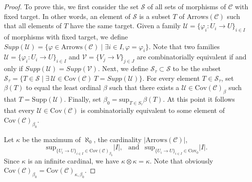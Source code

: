\begin{proof}
To prove this, we first consider the set $\mathcal{S}$ of all
sets of morphisms of $\mathcal{C}$ with fixed target.
In other words, an element of $\mathcal{S}$ is a subset $T$
of $\text{Arrows}(\mathcal{C})$ such that all
elements of $T$ have the same target. Given a family
$\mathcal{U} = \{\varphi_i : U_i \to U\}_{i\in I}$ of morphisms with fixed
target, we define
$Supp(\mathcal{U}) = \{ \varphi \in \text{Arrows}(\mathcal{C})
\mid \exists i\in I, \varphi = \varphi_i\}$.
Note that two families $\mathcal{U} =  \{\varphi_i : U_i \to U\}_{i\in I}$
and $\mathcal{V} = \{V_j \to V\}_{j \in J}$ are combinatorially
equivalent if and only if $Supp(\mathcal{U}) = Supp(\mathcal{V})$.
Next, we define
$\mathcal{S}_\tau \subset \mathcal{S}$ to be the subset
$\mathcal{S}_\tau = \{ T \in \mathcal{S} \mid
\exists\ \mathcal{U} \in \text{Cov}(\mathcal{C}) \ T = Supp(\mathcal{U})\}$.
For every element $T \in \mathcal{S}_\tau$, set
$\beta(T)$ to equal the least ordinal $\beta$ such that
there exists a $\mathcal{U} \in \text{Cov}(\mathcal{C})_\beta$
such that $T = \text{Supp}(\mathcal{U})$. Finally, set
$\beta_0 = \text{sup}_{T \in S_\tau} \beta(T)$.
At this point it follows that every $\mathcal{U} \in \text{Cov}(\mathcal{C})$
is combinatorially equivalent to some element
of $\text{Cov}(\mathcal{C})_{\beta_0}$.

\medskip\noindent
Let $\kappa$ be the maximum of $\aleph_0$,
the cardinality $|\text{Arrows}(\mathcal{C})|$,
$$
\text{sup}_{\{U_i \to U\}_{i\in I} \in \text{Cov}(\mathcal{C})_{\beta_0}} |I|,
\ \ \text{ and }\ \ 
\text{sup}_{\{U_i \to U\}_{i\in I} \in \text{Cov}_0} |I|.
$$
Since $\kappa$ is an infinite cardinal, we have
$\kappa \otimes \kappa = \kappa$. Note that obviously
$\text{Cov}(\mathcal{C})_{\beta_0} =
\text{Cov}(\mathcal{C})_{\kappa, \beta_0}$.


\end{proof}

